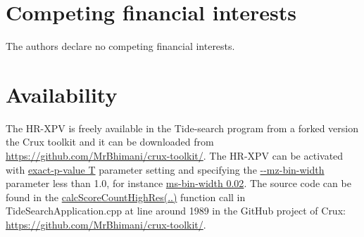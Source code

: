 \documentclass{article}
\begin{document}
\section*{Competing financial interests}
The authors declare no competing financial interests.


\section*{Availability}
The HR-XPV is freely available in the Tide-search program from a forked version the Crux toolkit and it can be downloaded from \url{https://github.com/MrBhimani/crux-toolkit/}. The HR-XPV can be activated with \url{exact-p-value T} parameter setting and specifying the \url{--mz-bin-width} parameter less than 1.0, for instance \url{ms-bin-width 0.02}. The source code can be found in the \url{calcScoreCountHighRes(..)} function call in TideSearchApplication.cpp at line around 1989 in the GitHub project of Crux: \url{https://github.com/MrBhimani/crux-toolkit/}.
%
%


\end{document}
